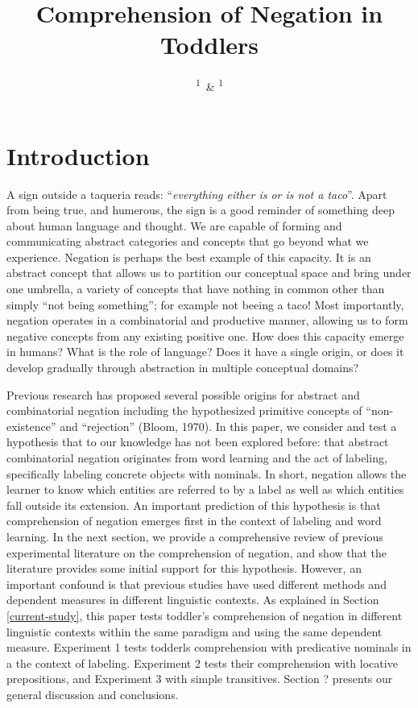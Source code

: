 \documentclass[man,floatsintext]{apa6}
\title{Comprehension of Negation in Toddlers}
\author{\textsuperscript{1}~\& \textsuperscript{1}}
\date{}
\affiliation{
\vspace{0.5cm}
\textsuperscript{1} \\\textsuperscript{2} }
\begin{document}
\maketitle

\hypertarget{introduction}{%
\section{Introduction}\label{introduction}}

A sign outside a taqueria reads: \enquote{\emph{everything either is or is not a taco}}. Apart from being true, and humerous, the sign is a good reminder of something deep about human language and thought. We are capable of forming and communicating abstract categories and concepts that go beyond what we experience. Negation is perhaps the best example of this capacity. It is an abstract concept that allows us to partition our conceptual space and bring under one umbrella, a variety of concepts that have nothing in common other than simply \enquote{not being something}; for example not beeing a taco! Most importantly, negation operates in a combinatorial and productive manner, allowing us to form negative concepts from any existing positive one. How does this capacity emerge in humans? What is the role of language? Does it have a single origin, or does it develop gradually through abstraction in multiple conceptual domains?

Previous research has proposed several possible origins for abstract and combinatorial negation including the hypothesized primitive concepts of \enquote{non-existence} and \enquote{rejection} (Bloom, 1970). In this paper, we consider and test a hypothesis that to our knowledge has not been explored before: that abstract combinatorial negation originates from word learning and the act of labeling, specifically labeling concrete objects with nominals. In short, negation allows the learner to know which entities are referred to by a label as well as which entities fall outside its extension. An important prediction of this hypothesis is that comprehension of negation emerges first in the context of labeling and word learning. In the next section, we provide a comprehensive review of previous experimental literature on the comprehension of negation, and show that the literature provides some initial support for this hypothesis. However, an important confound is that previous studies have used different methods and dependent measures in different linguistic contexts. As explained in Section \ref{current-study}, this paper tests toddler's comprehension of negation in different linguistic contexts within the same paradigm and using the same dependent measure. Experiment 1 tests todderls comprehension with predicative nominals in a the context of labeling. Experiment 2 tests their comprehension with locative prepositions, and Experiment 3 with simple transitives. Section ? presents our general discussion and conclusions.
\end{document}
